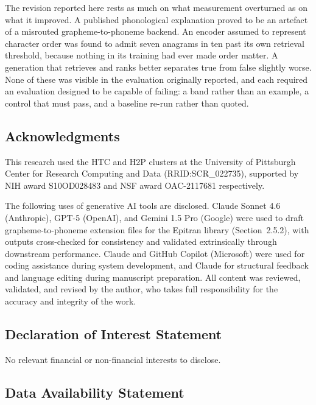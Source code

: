 \documentclass[11pt,a4paper]{article}
\begin{document}
The revision reported here rests as much on what measurement overturned as on what it improved. A published phonological explanation proved to be an artefact of a misrouted grapheme-to-phoneme backend. An encoder assumed to represent character order was found to admit seven anagrams in ten past its own retrieval threshold, because nothing in its training had ever made order matter. A generation that retrieves and ranks better separates true from false slightly worse. None of these was visible in the evaluation originally reported, and each required an evaluation designed to be capable of failing: a band rather than an example, a control that must pass, and a baseline re-run rather than quoted.
\subsection*{Acknowledgments}

This research used the HTC and H2P clusters at the University of Pittsburgh Center for Research Computing and Data (RRID:SCR\_022735), supported by NIH award S10OD028483 and NSF award OAC-2117681 respectively.

The following uses of generative AI tools are disclosed. Claude Sonnet 4.6 (Anthropic), GPT-5 (OpenAI), and Gemini 1.5 Pro (Google) were used to draft grapheme-to-phoneme extension files for the Epitran library (Section~2.5.2), with outputs cross-checked for consistency and validated extrinsically through downstream performance. Claude and GitHub Copilot (Microsoft) were used for coding assistance during system development, and Claude for structural feedback and language editing during manuscript preparation. All content was reviewed, validated, and revised by the author, who takes full responsibility for the accuracy and integrity of the work.

\subsection*{Declaration of Interest Statement}

No relevant financial or non-financial interests to disclose.

\subsection*{Data Availability Statement}
\label{subsec:availability}
\end{document}
